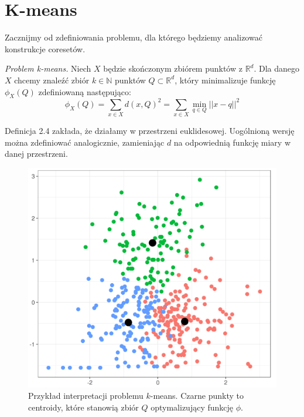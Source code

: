 \section{K-means}

Zacznijmy od zdefiniowania problemu, dla którego będziemy analizować konstrukcje coresetów.

\begin{definition}
    \emph{Problem k-means.} Niech $X$ będzie skończonym zbiórem punktów z $\mathbb{R}^{d}$. 
    Dla danego $X$ chcemy znaleźć zbiór $k \in \mathbb{N}$ punktów $Q \subset \mathbb{R}^{d}$, który minimalizuje funkcję $\phi_{X}(Q)$ zdefiniowaną następująco:
    \begin{equation}
        \phi_{X}(Q) = \sum_{x \in X} d(x, Q)^{2} = \sum_{x \in X} \min_{q \in Q} || x - q ||^{2} 
    \end{equation}
\end{definition}

\noindent
Definicja 2.4 zakłada, że działamy w przestrzeni euklidesowej.
Uogólnioną wersję można zdefiniować analogicznie, zamieniając $d$ na odpowiednią funkcję miary w danej przestrzeni.

\begin{figure}[H]
    \centering
    \includegraphics[totalheight=5cm]{cluster.png}
    \caption{Przykład interpretacji problemu $k$-means. Czarne punkty to centroidy, które stanowią zbiór $Q$ optymalizujący funkcję $\phi$.}
\end{figure}

